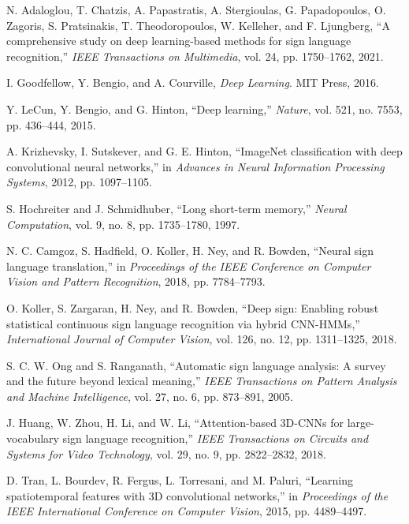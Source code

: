 \documentclass[11pt, a4paper]{article}
\begin{document}
\begin{thebibliography}{99}

N. Adaloglou, T. Chatzis, A. Papastratis, A. Stergioulas, G. Papadopoulos, O. Zagoris, S. Pratsinakis, T. Theodoropoulos, W. Kelleher, and F. Ljungberg, 
``A comprehensive study on deep learning-based methods for sign language recognition,''
\textit{IEEE Transactions on Multimedia}, vol. 24, pp. 1750--1762, 2021.

I. Goodfellow, Y. Bengio, and A. Courville,
\textit{Deep Learning}.
MIT Press, 2016.

Y. LeCun, Y. Bengio, and G. Hinton,
``Deep learning,''
\textit{Nature}, vol. 521, no. 7553, pp. 436--444, 2015.

A. Krizhevsky, I. Sutskever, and G. E. Hinton,
``ImageNet classification with deep convolutional neural networks,''
in \textit{Advances in Neural Information Processing Systems}, 2012, pp. 1097--1105.

S. Hochreiter and J. Schmidhuber,
``Long short-term memory,''
\textit{Neural Computation}, vol. 9, no. 8, pp. 1735--1780, 1997.

N. C. Camgoz, S. Hadfield, O. Koller, H. Ney, and R. Bowden,
``Neural sign language translation,''
in \textit{Proceedings of the IEEE Conference on Computer Vision and Pattern Recognition}, 2018, pp. 7784--7793.

O. Koller, S. Zargaran, H. Ney, and R. Bowden,
``Deep sign: Enabling robust statistical continuous sign language recognition via hybrid CNN-HMMs,''
\textit{International Journal of Computer Vision}, vol. 126, no. 12, pp. 1311--1325, 2018.

S. C. W. Ong and S. Ranganath,
``Automatic sign language analysis: A survey and the future beyond lexical meaning,''
\textit{IEEE Transactions on Pattern Analysis and Machine Intelligence}, vol. 27, no. 6, pp. 873--891, 2005.

J. Huang, W. Zhou, H. Li, and W. Li,
``Attention-based 3D-CNNs for large-vocabulary sign language recognition,''
\textit{IEEE Transactions on Circuits and Systems for Video Technology}, vol. 29, no. 9, pp. 2822--2832, 2018.

D. Tran, L. Bourdev, R. Fergus, L. Torresani, and M. Paluri,
``Learning spatiotemporal features with 3D convolutional networks,''
in \textit{Proceedings of the IEEE International Conference on Computer Vision}, 2015, pp. 4489--4497.


\end{thebibliography}
\end{document}
